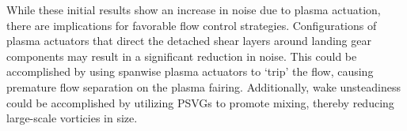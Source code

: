 While these initial results show an increase in noise due to plasma actuation, there are implications for favorable flow control strategies. Configurations of plasma actuators that direct the detached shear layers around landing gear components may result in a significant reduction in noise. This could be accomplished by using spanwise plasma actuators to `trip' the flow, causing premature flow separation on the plasma fairing. Additionally, wake unsteadiness could be accomplished by utilizing PSVGs to promote mixing, thereby reducing large-scale vorticies in size.

%
%
%

